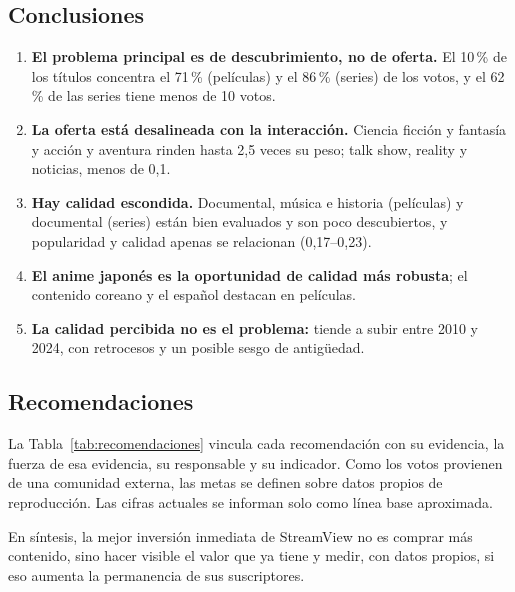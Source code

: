 \documentclass[conference,a4paper]{IEEEtran}
\begin{document}
\subsection{Conclusiones}
\begin{enumerate}
\item \textbf{El problema principal es de descubrimiento, no de oferta.} El 10\,\% de los títulos concentra el 71\,\% (películas) y el 86\,\% (series) de los votos, y el 62\,\% de las series tiene menos de 10 votos.
\item \textbf{La oferta está desalineada con la interacción.} Ciencia ficción y fantasía y acción y aventura rinden hasta 2,5 veces su peso; talk show, reality y noticias, menos de 0,1.
\item \textbf{Hay calidad escondida.} Documental, música e historia (películas) y documental (series) están bien evaluados y son poco descubiertos, y popularidad y calidad apenas se relacionan (0,17--0,23).
\item \textbf{El anime japonés es la oportunidad de calidad más robusta}; el contenido coreano y el español destacan en películas.
\item \textbf{La calidad percibida no es el problema:} tiende a subir entre 2010 y 2024, con retrocesos y un posible sesgo de antigüedad.
\end{enumerate}

\subsection{Recomendaciones}
La Tabla~\ref{tab:recomendaciones} vincula cada recomendación con su evidencia, la fuerza de esa evidencia, su responsable y su indicador. Como los votos provienen de una comunidad externa, las metas se definen sobre datos propios de reproducción. Las cifras actuales se informan solo como línea base aproximada.



En síntesis, la mejor inversión inmediata de StreamView no es comprar más contenido, sino hacer visible el valor que ya tiene y medir, con datos propios, si eso aumenta la permanencia de sus suscriptores.

\appendices
\end{document}
